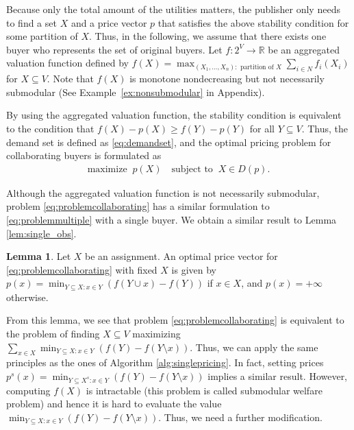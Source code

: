 \documentclass[letterpaper]{article}
\theoremstyle{definition}
\newtheorem{lemma}[theorem]{Lemma}
\begin{document}
%
Because only the total amount of the utilities matters, the publisher only needs to find a set $X$ and a price vector $p$ that satisfies the above stability condition for some partition of $X$. 
Thus, in the following, we assume that there exists one buyer who
represents the set of original buyers.
Let $f: 2^V \to \mathbb{R}$ be an aggregated valuation function defined by
$f(X) = \max_{(X_1,\dots,X_n):\text{ partition of } X}  \sum_{i\in N}f_i(X_i)$
for $X \subseteq V$. 
Note that $f(X)$ is monotone nondecreasing but not necessarily submodular %
(See Example~\ref{ex:nonsubmodular} in Appendix).


By using the aggregated valuation function, 
the stability condition is equivalent to the condition that $ f(X) - p(X) \ge f(Y) - p(Y)$
for all $Y \subseteq V$. 
Thus, the demand set is defined as \eqref{eq:demandset}, and the optimal pricing problem for collaborating buyers is formulated as
\begin{align}
  \label{eq:problemcollaborating}
    \text{maximize} \; \; p(X) \quad
    \text{subject to} \; \; X \in D(p).
\end{align}

Although the aggregated valuation function 
is not necessarily submodular, problem \eqref{eq:problemcollaborating} has a similar formulation to \eqref{eq:problemmultiple} with a single buyer. 
We obtain a similar result to Lemma \ref{lem:single_obs}. 
\begin{lemma}\label{lem:collaborating_obs}
Let $X$ be an assignment. 
An optimal price vector for \eqref{eq:problemcollaborating} with fixed $X$ is given by 
$p(x) =  \min_{Y\subseteq X: x\in Y}(f(Y\cup x) - f(Y))$ if $x \in X$, and $p(x) = +\infty$ otherwise.
\end{lemma}

From this lemma, we see that problem \eqref{eq:problemcollaborating} is equivalent to the problem of finding $X \subseteq V$ maximizing $\sum_{x \in X} \min_{Y\subseteq X: x\in Y}(f(Y) - f(Y \setminus x))$. 
Thus, we can apply the same principles as the ones of Algorithm \ref{alg:singlepricing}.
In fact, setting prices $p^s(x)=\min_{Y\subseteq X^s: x\in Y}(f(Y)-f(Y\setminus x))$ implies a similar result.
However, computing $f(X)$ is intractable (this problem is called submodular welfare problem)
and hence 
it is hard to evaluate the value \(\min_{Y\subseteq X: x\in Y}(f(Y)-f(Y\setminus x))\).
Thus, we need a further modification.
\end{document}
